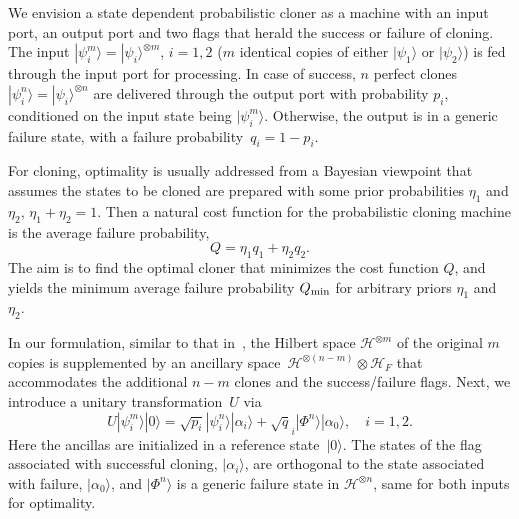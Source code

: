 \documentclass[aps,prl,twocolumn,showpacs]{revtex4}
\newcommand{\ke}[1]{|#1\rangle}
\begin{document}
We envision a state dependent probabilistic cloner as a machine with an input port, an output port and two flags that herald the success or failure of cloning.  The input $|\psi_i^m\rangle=|\psi_i\rangle^{\otimes m}$, $i=1,2$ ($m$ identical copies of either $|\psi_1\rangle$ or $|\psi_2\rangle$) is fed through the input port for processing. In case of success, $n$ perfect clones~$|\psi_i^n\rangle=|\psi_i\rangle^{\otimes n}$ are delivered through the output port with probability $p_i$, conditioned on the input state being $|\psi^m_i\rangle$. Otherwise, the output is in a generic failure state, with a failure probability~$q_i=1-p_i$.

For cloning, optimality is usually addressed from a Bayesian viewpoint that assumes the states to be cloned are prepared with some prior probabilities $\eta_1$ and $\eta_2$, $\eta_1+\eta_2=1$. Then a natural cost function for the probabilistic cloning machine is the average failure probability, 
%
\begin{equation}
Q=\eta_1 q_1+\eta_2 q_2.
\label{obj fun}
\end{equation}
%
The aim is to find the optimal cloner that minimizes the cost function $Q$, and yields the minimum average failure probability $Q_{\rm min}$ for arbitrary priors $\eta_1$ and $\eta_2$.

%
%

In our formulation, similar to that in~\cite{DuanGuo}, the Hilbert space ${\mathscr H}^{\otimes m}$ of the original $m$ copies is supplemented by an ancillary space~${\mathscr H}^{\otimes(n-m)}\otimes {\mathscr H}_F$ that accommodates the additional $n-m$ clones and the success/failure flags. Next, we introduce a unitary transformation~$U$ via
%
\begin{equation}
U|\psi^m_i\rangle|0\rangle= \sqrt{p_i}|\psi^n_i\rangle|\alpha_i\rangle +\sqrt q_i |\Phi^{n}\rangle |\alpha_{0}\rangle,\quad i=1,2. \label{Ui}
\end{equation}
%
Here the ancillas are initialized in a reference state~$\ke 0$. The states of the flag associated with successful cloning, $\ke {\alpha_i}$, are orthogonal to the state associated with failure, $\ke{\alpha_{0}}$, and $\ke{\Phi^{n}}$ is a generic failure state in ${\mathscr H}^{\otimes n}$, same for both inputs for optimality. 
\end{document}
